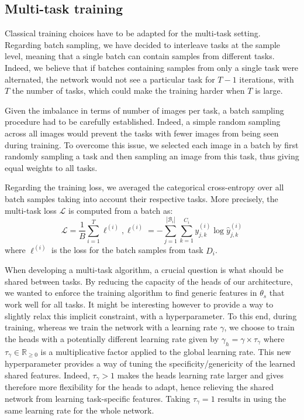 \subsection{Multi-task training}
\label{ssec:mtask:multitask-training}

Classical training choices have to be adapted for the multi-task setting. Regarding batch sampling, we have decided to interleave tasks at the sample level, meaning that a single batch can contain samples from different tasks. Indeed, we believe that if batches containing samples from only a single task were alternated, the network would not see a particular task for $T-1$ iterations, with $T$ the number of tasks, which could make the training harder when $T$ is large.

Given the imbalance in terms of number of images per task, a batch sampling procedure had to be carefully established. Indeed, a simple random sampling across all images would prevent the tasks with fewer images from being seen during training. To overcome this issue, we selected each image in a batch by first randomly sampling a task and then sampling an image from this task, thus giving equal weights to all tasks.

Regarding the training loss, we averaged the categorical cross-entropy over all batch samples taking into account their respective tasks. More precisely, the multi-task loss $\mathcal{L}$ is computed from a batch as:
\begin{equation}\label{eqn:loss}
\mathcal{L} = \frac{1}{B} \sum_{i=1}^T \ell^{(i)}, \ell^{(i)} = - \sum_{j=1}^{\left|\mathcal{B}_{i}\right|} \sum_{k=1}^{C_{i}} y^{(i)}_{j,k} \log \hat{y}^{(i)}_{j,k}
\end{equation}
where $\ell^{(i)}$ is the loss for the batch samples from task $D_i$.

When developing a multi-task algorithm, a crucial question is what should be shared between tasks. By reducing the capacity of the heads of our architecture, we wanted to enforce the training algorithm to find generic features in $\theta_s$ that work well for all tasks. It might be interesting however to provide a way to slightly relax this implicit constraint, with a hyperparameter. To this end, during training, whereas we train the network with a learning rate $\gamma$, we choose to train the heads with a potentially different learning rate given by $\gamma_h = \gamma \times \tau_\gamma$ where $\tau_\gamma \in \mathbb{R}_{\geq0}$ is a multiplicative factor applied to the global learning rate. This new hyperparameter provides a way of tuning the specificity/genericity of the learned shared features.  Indeed, $\tau_\gamma > 1$ makes the heads learning rate larger and gives therefore more flexibility for the heads to adapt, hence relieving the shared network from learning task-specific features. Taking $\tau_\gamma = 1$ results in using the same learning rate for the whole network.

